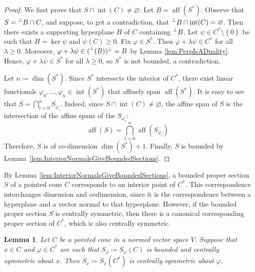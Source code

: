 \documentclass[10pt]{amsart}
\newtheorem{lemma}[thm]{Lemma}
\theoremstyle{definition}
\theoremstyle{remark}
\begin{document}
\begin{proof}
   We first prove that $S \cap {\operatorname{int}}(C) \ne {\varnothing}$.  Let $B =
   \operatorname{aff}({S^{\ast}})$.  Observe that $S = {\prescript{\perp}{}{{B}}} \cap C$, and
   suppose, to get a contradiction, that ${\prescript{\perp}{}{{B}}} \cap {\operatorname{int}}(C)
   = {\varnothing}$.  Then there exists a supporting hyperplane $H$ of
   $C$ containing ${\prescript{\perp}{}{{B}}}$.  Let $\psi \in {C^{\ast}}
   \setminus{\left\lbrace {0} \right\rbrace}$ be such that $H = \ker \psi$ and $\psi(C)
   \ge 0$.  Fix ${\varphi} \in {S^{\ast}}$.  Then ${\varphi} + \lambda\psi \in
   {C^{\ast}}$ for all $\lambda \ge 0$.  Moreover, ${\varphi} + \lambda
   \psi \in ({\prescript{\perp}{}{(}}B))^{\perp} = B$ by Lemma
   \ref{lem:PerpIsADuality}.  Hence, ${\varphi} + \lambda\psi \in
   {{S}^{\ast}}$ for all $\lambda \ge 0$, so ${S^{\ast}}$ is not
   bounded, a contradiction.
   
   Let $n {\mathrel{\coloneqq}} \dim({S^{\ast}})$.  Since ${S^{\ast}}$ intersects
   the interior of ${C^{\ast}}$, there exist linear functionals
   ${\varphi}_{0}, \dotsc, {\varphi}_{n} \in {\operatorname{int}}({S^{\ast}})$ that affinely
   span $\operatorname{aff}({S^{\ast}})$.  It is easy to see that $S =
   \bigcap_{i=0}^{n} S_{{\varphi}_{i}}$.  Indeed, since $S \cap
   {\operatorname{int}}(C) \ne {\varnothing}$, the affine span of $S$ is the 
   intersection of the affine spans of the $S_{{\varphi}_{i}}$:
   \begin{equation*}
      \operatorname{aff}(S) = \bigcap_{i=0}^{n} \operatorname{aff}(S_{{\varphi}_{i}})
   \end{equation*}
   Therefore, $S$ is of co-dimension $\dim({S^{\ast}}) + 1$.
   Finally, $S$ is bounded by
   Lemma~\ref{lem:InteriorNormalsGiveBoundedSections}.
\end{proof}

By Lemma \ref{lem:InteriorNormalsGiveBoundedSections}, a bounded
proper section $S$ of a pointed cone $C$ corresponds to an
interior point of ${C^{\ast}}$.  This correspondence interchanges
dimension and codimension, since it is the correspondence between
a hyperplane and a vector normal to that hyperplane.  However, if
the bounded proper section $S$ is centrally symmetric, then there
is a canonical corresponding proper section of ${C^{\ast}}$, which
is also centrally symmetric.

\begin{lemma}
   \label{lem:NormalOfCentSymmSectionIsCentOfSymm}
   Let $C$ be a pointed cone in a normed vector space $V$.
   Suppose that $x \in C$ and ${\varphi} \in {C^{\ast}}$ are such that
   $S_{\varphi} {\mathrel{\coloneqq}} S_{\varphi}(C)$ is bounded and centrally
   symmetric about $x$.  Then $S_{x} {\mathrel{\coloneqq}} S_{x}({C^{\ast}})$ is
   centrally symmetric about ${\varphi}$.
\end{lemma}
\end{document}
